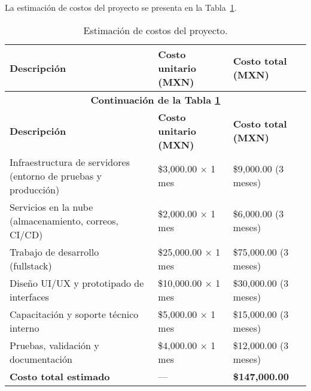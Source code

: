 La estimación de costos del proyecto se presenta en la Tabla~\ref{table:tablaCostos}.

\begin{longtable}{m{6.5cm} m{4.5cm} m{4cm}}
	\caption{Estimación de costos del proyecto.}
  	\label{table:tablaCostos}\\
  	\toprule
	\textbf{Descripción} & \textbf{Costo unitario (MXN)} & \textbf{Costo total (MXN)} \\
	\hline
	\endfirsthead

	\multicolumn{3}{c}{\textbf{Continuación de la Tabla \ref{table:tablaCostos}}}\\
	\hline
	\textbf{Descripción} & \textbf{Costo unitario (MXN)} & \textbf{Costo total (MXN)} \\
	\hline
	\endhead

	\hline
	\endlastfoot

Infraestructura de servidores (entorno de pruebas y producción) & \$3,000.00 $\times$ 1 mes & \$9,000.00 (3 meses) \\
\midrule

Servicios en la nube (almacenamiento, correos, CI/CD) & \$2,000.00 $\times$ 1 mes & \$6,000.00 (3 meses) \\
\midrule

Trabajo de desarrollo (fullstack)~\cite{Desarrollador} & \$25,000.00 $\times$ 1 mes & \$75,000.00 (3 meses) \\
\midrule

Diseño UI/UX y prototipado de interfaces & \$10,000.00 $\times$ 1 mes & \$30,000.00 (3 meses) \\
\midrule

Capacitación y soporte técnico interno & \$5,000.00 $\times$ 1 mes & \$15,000.00 (3 meses) \\
\midrule

Pruebas, validación y documentación & \$4,000.00 $\times$ 1 mes & \$12,000.00 (3 meses) \\
\midrule

\textbf{Costo total estimado} & — & \textbf{\$147,000.00} \\
\bottomrule
\end{longtable}

